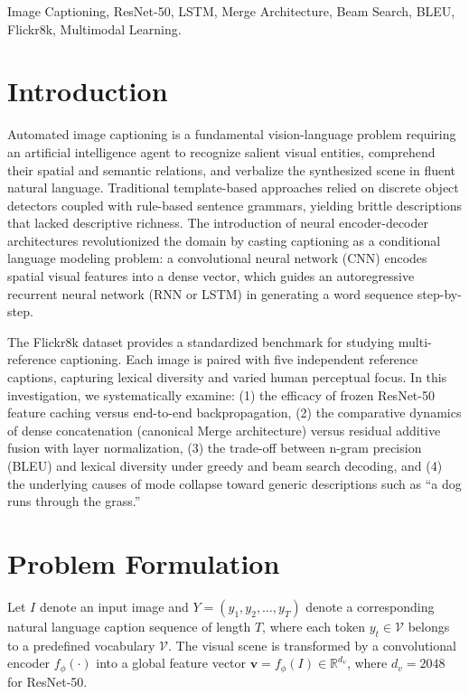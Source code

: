 \documentclass[conference]{IEEEtran}
\begin{document}
\begin{IEEEkeywords}
Image Captioning, ResNet-50, LSTM, Merge Architecture, Beam Search, BLEU, Flickr8k, Multimodal Learning.
\end{IEEEkeywords}

\section{Introduction}
Automated image captioning is a fundamental vision-language problem requiring an artificial intelligence agent to recognize salient visual entities, comprehend their spatial and semantic relations, and verbalize the synthesized scene in fluent natural language. Traditional template-based approaches relied on discrete object detectors coupled with rule-based sentence grammars, yielding brittle descriptions that lacked descriptive richness. The introduction of neural encoder-decoder architectures revolutionized the domain by casting captioning as a conditional language modeling problem: a convolutional neural network (CNN) encodes spatial visual features into a dense vector, which guides an autoregressive recurrent neural network (RNN or LSTM) in generating a word sequence step-by-step.

The Flickr8k dataset provides a standardized benchmark for studying multi-reference captioning. Each image is paired with five independent reference captions, capturing lexical diversity and varied human perceptual focus. In this investigation, we systematically examine: (1) the efficacy of frozen ResNet-50 feature caching versus end-to-end backpropagation, (2) the comparative dynamics of dense concatenation (canonical Merge architecture) versus residual additive fusion with layer normalization, (3) the trade-off between n-gram precision (BLEU) and lexical diversity under greedy and beam search decoding, and (4) the underlying causes of mode collapse toward generic descriptions such as ``a dog runs through the grass.''

\section{Problem Formulation}
Let $I$ denote an input image and $Y = (y_1, y_2, \dots, y_T)$ denote a corresponding natural language caption sequence of length $T$, where each token $y_t \in \mathcal{V}$ belongs to a predefined vocabulary $\mathcal{V}$. The visual scene is transformed by a convolutional encoder $f_\phi(\cdot)$ into a global feature vector $\mathbf{v} = f_\phi(I) \in \mathbb{R}^{d_v}$, where $d_v = 2048$ for ResNet-50.
\end{document}
